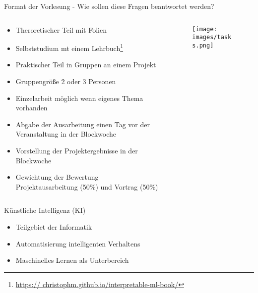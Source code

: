 \documentclass[aspectratio=1610, xcolor=dvipsnames, 9pt]{beamer}
\begin{document}
\begin{frame}{Format der Vorlesung - Wie sollen diese Fragen beantwortet werden?}
  \begin{columns}
    \begin{column}{0.69\textwidth}
      \begin{itemize}
        \item Theroretischer Teil mit Folien \newline
        \item Selbststudium mt einem Lehrbuch\footnote{\url{https:// christophm.github.io/interpretable-ml-book/}} \newline
        \item Praktischer Teil in Gruppen an einem Projekt  \newline
        \item Gruppengröße 2 oder 3 Personen  \newline
        \item Einzelarbeit möglich wenn eigenes Thema vorhanden \newline
        \item Abgabe der Ausarbeitung einen Tag vor der Veranstaltung in der Blockwoche \newline
        \item Vorstellung der Projektergebnisse in der Blockwoche \newline
        \item Gewichtung der Bewertung Projektausarbeitung (50\%) und Vortrag (50\%)
      \end{itemize}
    \end{column}
    \begin{column}{0.3\textwidth}
 \begin{figure}
 \centering
             \texttt{[image: images/tasks.png]} 
 \end{figure}
  \end{column}
  \end{columns}
\end{frame}

\begin{frame}{Künstliche Intelligenz (KI)}
    \begin{itemize}
        \item Teilgebiet der Informatik \newline
        \item Automatisierung intelligenten Verhaltens \newline
        \item Maschinelles Lernen als Unterbereich \newline
    \end{itemize}
\end{frame}
\end{document}

